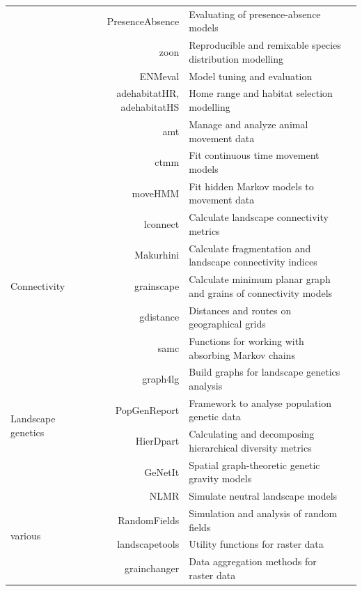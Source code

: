 \documentclass[smallextended]{svjour3}       %
\begin{document}
\begin{table}
\begin{tabularx}{450pt}{lrXr}
& PresenceAbsence & Evaluating of presence-absence models & \cite{Freeman2008} \\
& zoon & Reproducible and remixable species distribution modelling & \cite{Golding2018} \\
& ENMeval & Model tuning and evaluation & \cite{R-enmeval} \\
& adehabitatHR, adehabitatHS & Home range and habitat selection modelling & \cite{Calenge2006} \\
& amt & Manage and analyze animal movement data &\cite{Signer2019} \\
& ctmm & Fit continuous time movement models &\cite{calabrese2016} \\
& moveHMM & Fit hidden Markov models to movement data &\cite{michelot2016} \\
\hline
\multirow{5}{*}{Connectivity} & lconnect & Calculate landscape connectivity metrics & \cite{Mestre2019} \\
& Makurhini & Calculate fragmentation and landscape connectivity indices & \cite{Godinez-Gomez2020} \\
& grainscape & Calculate minimum planar graph and grains of connectivity models & \cite{Chubaty2020} \\
& gdistance & Distances and routes on geographical grids & \cite{vanEtten2017} \\
& samc & Functions for working with absorbing Markov chains & \cite{Marx2020} \\
\hline
\multirow{4}{*}{Landscape genetics} & graph4lg & Build graphs for landscape genetics analysis & \cite{Savary2020} \\
& PopGenReport & Framework to analyse population genetic data & \cite{Adamack2014,Gruber2015} \\
& HierDpart & Calculating and decomposing hierarchical diversity metrics & \cite{Qin2019} \\
& GeNetIt & Spatial graph-theoretic genetic gravity models & \cite{Murphy2010} \\
\hline
\multirow{4}{*}{various} & NLMR & Simulate neutral landscape models & \cite{Sciaini2018} \\
& RandomFields & Simulation and analysis of random fields & \cite{Schlather2015} \\
& landscapetools & Utility functions for raster data & \cite{Sciaini2018}  \\
& grainchanger & Data aggregation methods for raster data & \cite{Graham2019} \\
\hline

\end{tabularx}

\label{tab:packages}

\end{table}
\end{document}
